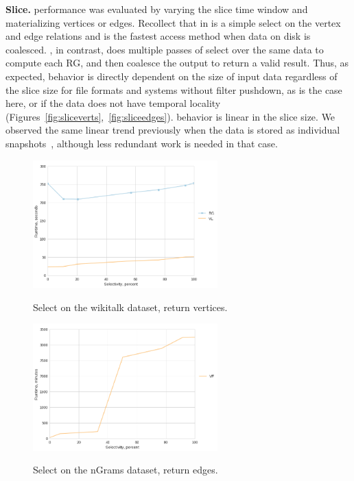 {\bf Slice.}   performance was evaluated by varying the
slice time window and materializing vertices or edges.  Recollect that
in \ve {} is a simple select on the vertex and edge
relations and is the fastest access method when data on disk is
coalesced.  \sg, in contrast, does multiple passes of select over the
same data to compute each RG, and then coalesce the output to return a
valid result.  Thus, as expected, \ve behavior is directly dependent on
the size of input data regardless of the slice size for file formats
and systems without filter pushdown, as is the case here, or if the
data does not have temporal locality
(Figures~\ref{fig:sliceverts},~\ref{fig:sliceedges}).  \sg behavior is
linear in the slice size.  We observed the same linear trend
previously when the data is stored as individual
snapshots~\cite{PortalarXiv2016}, although less redundant work is
needed in that case.

\begin{figure}
\centering
\begin{minipage}{3.3in}
\centering
\includegraphics[width=2.8in]{figs/select_wikitalk_vertices_build12.png}
\caption{Select on the wikitalk dataset, return vertices.}
\vspace{-0.1in}
\label{fig:selectv}
\vspace{-0.1in}
\end{minipage}
\begin{minipage}{3.3in}
\centering
\includegraphics[width=2.8in]{figs/select_ngrams_edges_build12.png}
\vspace{-0.1in}
\caption{Select on the nGrams dataset, return edges.}
\vspace{-0.1in}
\label{fig:selecte}
\end{minipage}
\end{figure}

